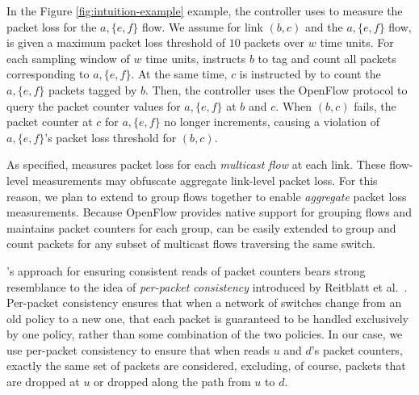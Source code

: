 



In the Figure \ref{fig:intuition-example} example, the controller uses \fl to measure the packet loss for the $a,\{e,f\}$ flow.  
We assume for link $(b,c)$ and the $a,\{e,f\}$ flow, \fl is given a maximum packet loss threshold of $10$ packets over $w$ time units.
For each sampling window of $w$ time units, \pcnt instructs $b$ to tag and count all packets corresponding to $a,\{e,f\}$. 
At the same time, $c$ is instructed by \pcnt to count the $a,\{e,f\}$ packets tagged by $b$. Then, the controller uses the OpenFlow protocol to query the packet counter values for $a,\{e,f\}$
at $b$ and $c$.  When $(b,c)$ fails, the packet counter at $c$ for $a,\{e,f\}$ no longer increments, causing a violation of $a,\{e,f\}$'s packet loss threshold for $(b,c)$.

As specified, \fl measures packet loss for each \emph{multicast flow} at each link.  These flow-level measurements may obfuscate aggregate link-level packet loss. For this
reason, we plan to extend \fl to group flows together to enable \emph{aggregate} packet loss measurements. 
Because OpenFlow provides native support for grouping flows and maintains packet counters for each 
group, \fl can be easily extended to group and count packets for any subset of multicast flows traversing the same switch.


\pcnts's approach for ensuring consistent reads of packet counters bears strong resemblance to the idea of \emph{per-packet consistency} introduced by Reitblatt et al.~\cite{Reitblatt11}.
Per-packet consistency ensures that when a network of switches change from an old policy to a new one, that
each packet is guaranteed to be handled exclusively by one policy, rather than some combination of the two policies.  In our case, we use per-packet consistency to ensure that when \pcnt reads
$u$ and $d$'s packet counters, exactly the same set of packets are considered, excluding, of course, packets that are dropped at $u$ or dropped along the path from $u$ to $d$. 

